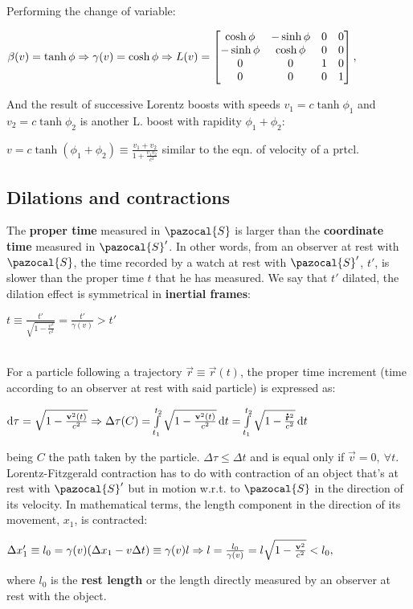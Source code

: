 Performing the change of variable:\\
\centerline{$\beta(v)=\tanh{\phi}\Rightarrow \gamma(v)=\cosh{\phi}\Rightarrow 
L(v)=\begin{bmatrix}
\cosh{\phi} & -\sinh{\phi} & 0 & 0\\
-\sinh{\phi} & \cosh{\phi} & 0 & 0\\
0 & 0 & 1 & 0 \\
0 & 0 & 0 & 1
\end{bmatrix},
$}
And the result of successive Lorentz boosts with speeds $v_{1}=c\tanh{\phi_{1}}$ and $v_{2}=c\tanh{\phi_{2}}$ is another L. boost with rapidity $\phi_{1}+\phi_{2}$:\\
\centerline{$v=c\tanh{(\phi_{1}+\phi_{2})}\equiv \frac{v_{1}+v_{2}}{1+\frac{v_{1}v_{2}}{c^{2}}}$ similar to the eqn. of velocity of a prtcl.}


\subsection{Dilations and contractions}
The \textbf{proper time} measured in $\pazocal{S}$ is larger than the \textbf{coordinate time} measured in $\pazocal{S}'$. In other words, from an observer at rest with $\pazocal{S}$, the time recorded by a watch at rest with $\pazocal{S}'$, $t'$, is slower than the proper time $t$ that he has measured. We say that $t'$ dilated, the dilation effect is symmetrical in \textbf{inertial frames}:\\
\centerline{$t\equiv \frac{t'}{\sqrt{1-\frac{v^{2}}{c^{2}}}}=\frac{t'}{\gamma(v)}>t'$}\\
For a particle following a trajectory $\vec{r}\equiv \vec{r}(t)$, the proper time increment (time according to an observer at rest with said particle) is expressed as:\\
\centerline{$\dd{\tau}=\sqrt{1-\frac{\mathbf{v}^{2}(t)}{c^{2}}}\Rightarrow \Delta\tau(C)=\int\limits_{t_{1}}^{t_{2}}\sqrt{1-\frac{\mathbf{v}^{2}(t)}{c^{2}}}\dd{t}=\int\limits_{t_{1}}^{t_{2}}\sqrt{1-\frac{\accentset{\mbox{\bfseries .}}{\mathbf{r}}^{2}}{c^{2}}}\dd{t}$}
being $C$ the path taken by the particle. $\Delta \tau\leq \Delta t$ and is equal only if $\vec{v}=0,\ \forall t$.\\

Lorentz-Fitzgerald contraction has to do with contraction of an object that's at rest with $\pazocal{S}'$ but in motion w.r.t. to $\pazocal{S}$ in the direction of its velocity. In mathematical terms, the length component in the direction of its movement, $x_{1}$, is contracted:\\
\centerline{$\Delta x_{1}'\equiv l_{0}=\gamma(v)(\Delta x_{1}-v\Delta t)\equiv \gamma(v)l\Rightarrow l=\frac{l_{0}}{\gamma(v)}=l\sqrt{1-\frac{\mathbf{v}^{2}}{c^{2}}}<l_{0},$}
where $l_{0}$ is the \textbf{rest length} or the length directly measured by an observer at rest with the object.



